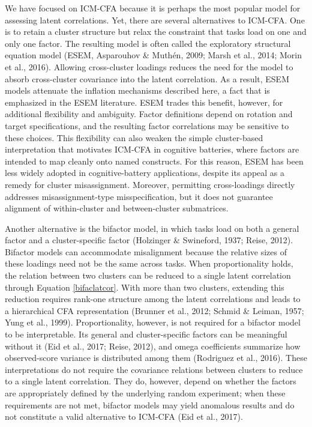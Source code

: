 \documentclass[
  american,
  man,floatsintext]{apa7}
\begin{document}
We have focused on ICM-CFA because it is perhaps the most popular model for assessing latent correlations. Yet, there are several alternatives to ICM-CFA. One is to retain a cluster structure but relax the constraint that tasks load on one and only one factor. The resulting model is often called the exploratory structural equation model (ESEM, Asparouhov \& Muthén, 2009; Marsh et al., 2014; Morin et al., 2016). Allowing cross-cluster loadings reduces the need for the model to absorb cross-cluster covariance into the latent correlation. As a result, ESEM models attenuate the inflation mechanisms described here, a fact that is emphasized in the ESEM literature. ESEM trades this benefit, however, for additional flexibility and ambiguity. Factor definitions depend on rotation and target specifications, and the resulting factor correlations may be sensitive to these choices. This flexibility can also weaken the simple cluster-based interpretation that motivates ICM-CFA in cognitive batteries, where factors are intended to map cleanly onto named constructs. For this reason, ESEM has been less widely adopted in cognitive-battery applications, despite its appeal as a remedy for cluster misassignment. Moreover, permitting cross-loadings directly addresses misassignment-type misspecification, but it does not guarantee alignment of within-cluster and between-cluster submatrices.

Another alternative is the bifactor model, in which tasks load on both a general factor and a cluster-specific factor (Holzinger \& Swineford, 1937; Reise, 2012). Bifactor models can accommodate misalignment because the relative sizes of these loadings need not be the same across tasks. When proportionality holds, the relation between two clusters can be reduced to a single latent correlation through Equation \eqref{bifaclatcor}. With more than two clusters, extending this reduction requires rank-one structure among the latent correlations and leads to a hierarchical CFA representation (Brunner et al., 2012; Schmid \& Leiman, 1957; Yung et al., 1999). Proportionality, however, is not required for a bifactor model to be interpretable. Its general and cluster-specific factors can be meaningful without it (Eid et al., 2017; Reise, 2012), and omega coefficients summarize how observed-score variance is distributed among them (Rodriguez et al., 2016). These interpretations do not require the covariance relations between clusters to reduce to a single latent correlation. They do, however, depend on whether the factors are appropriately defined by the underlying random experiment; when these requirements are not met, bifactor models may yield anomalous results and do not constitute a valid alternative to ICM-CFA (Eid et al., 2017).
\end{document}
